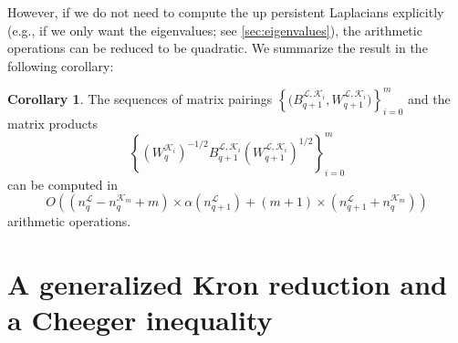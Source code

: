 \documentclass{article}
\theoremstyle{definition}
\newtheorem{corollary}[theorem]{Corollary}
\newcommand{\KK}{\mathcal{K}}
\newcommand{\LL}{\mathcal{L}}
\begin{document}
However,
if we do not need to compute the up persistent Laplacians explicitly (e.g., if we only want the eigenvalues; see \cref{sec:eigenvalues}), the arithmetic operations can be reduced to be quadratic. We summarize the result in the following corollary:

\begin{corollary}\label{cor:filt}
The sequences of matrix pairings $\left\{\big(B_{q+1}^{\LL, \KK_i}, W_{q+1}^{\LL, \KK_i}\big)\right\}_{i=0}^m$ and the matrix products 
\[\left\{(W_q^{\KK_i})^{-1/2}B_{q+1}^{\LL, \KK_i} (W_{q+1}^{\LL, \KK_i})^{1/2}\right\}_{i=0}^m\] 
can be computed in 
\[
O\left((n_q^\LL-n_q^{\KK_m}+m)\times \alpha(n_{q+1}^\LL) + (m+1)\times (n_{q+1}^\LL + n_q^{\KK_m})\right)
\]
arithmetic operations.
\end{corollary}

\section{A generalized Kron reduction and a Cheeger inequality}\label{subsec:kron_red}
\end{document}
